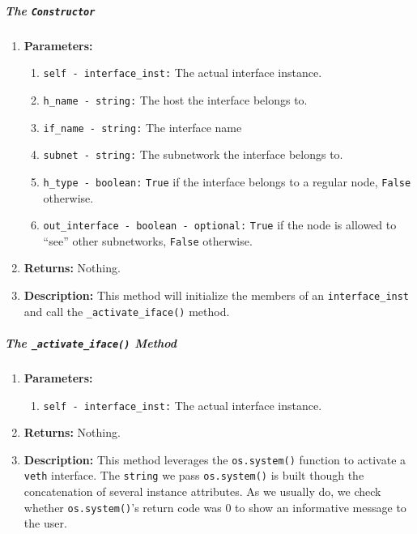         \subparagraph{The \texttt{Constructor}}
            \begin{enumerate}
                \item \textbf{Parameters:}
                \begin{enumerate}
                    \item \texttt{self - interface\_inst:} The actual interface instance.
                    \item \texttt{h\_name - string:} The host the interface belongs to.
                    \item \texttt{if\_name - string:} The interface name
                    \item \texttt{subnet - string:} The subnetwork the interface belongs to.
                    \item \texttt{h\_type - boolean:} \texttt{True} if the interface belongs to a regular node, \texttt{False} otherwise.
                    \item \texttt{out\_interface - boolean - optional:} \texttt{True} if the node is allowed to ``see'' other subnetworks, \texttt{False} otherwise.
                \end{enumerate}
                \item \textbf{Returns:} Nothing.
                \item \textbf{Description:} This method will initialize the members of an \texttt{interface\_inst} and call the \texttt{\_activate\_iface()} method.
            \end{enumerate}

        \subparagraph{The \texttt{\_activate\_iface()} Method}
            \begin{enumerate}
                \item \textbf{Parameters:}
                \begin{enumerate}
                    \item \texttt{self - interface\_inst:} The actual interface instance.
                \end{enumerate}
                \item \textbf{Returns:} Nothing.
                \item \textbf{Description:} This method leverages the \texttt{os.system()} function to activate a \texttt{veth} interface. The \texttt{string} we pass \texttt{os.system()} is built though the concatenation of several instance attributes. As we usually do, we check whether \texttt{os.system()}'s return code was $0$ to show an informative message to the user.
            \end{enumerate}

